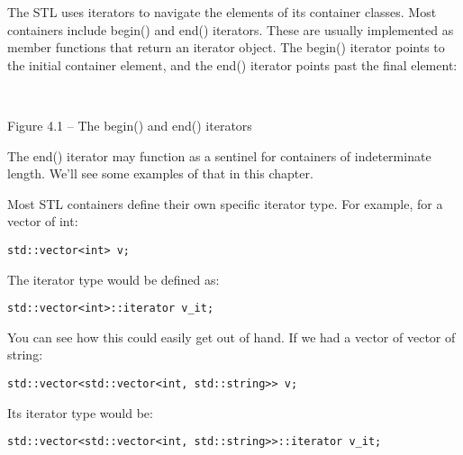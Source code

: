 

The STL uses iterators to navigate the elements of its container classes. Most containers include begin() and end() iterators. These are usually implemented as member functions that return an iterator object. The begin() iterator points to the initial container element, and the end() iterator points past the final element:

\hspace*{\fill} \\ %
\begin{center}

Figure 4.1 – The begin() and end() iterators
\end{center}

The end() iterator may function as a sentinel for containers of indeterminate length.
We'll see some examples of that in this chapter.

Most STL containers define their own specific iterator type. For example, for a vector of int:

\begin{lstlisting}[style=styleCXX]
std::vector<int> v;
\end{lstlisting}

The iterator type would be defined as:

\begin{lstlisting}[style=styleCXX]
std::vector<int>::iterator v_it;
\end{lstlisting}

You can see how this could easily get out of hand. If we had a vector of vector of string:

\begin{lstlisting}[style=styleCXX]
std::vector<std::vector<int, std::string>> v;
\end{lstlisting}

Its iterator type would be:

\begin{lstlisting}[style=styleCXX]
std::vector<std::vector<int, std::string>>::iterator v_it;
\end{lstlisting}

